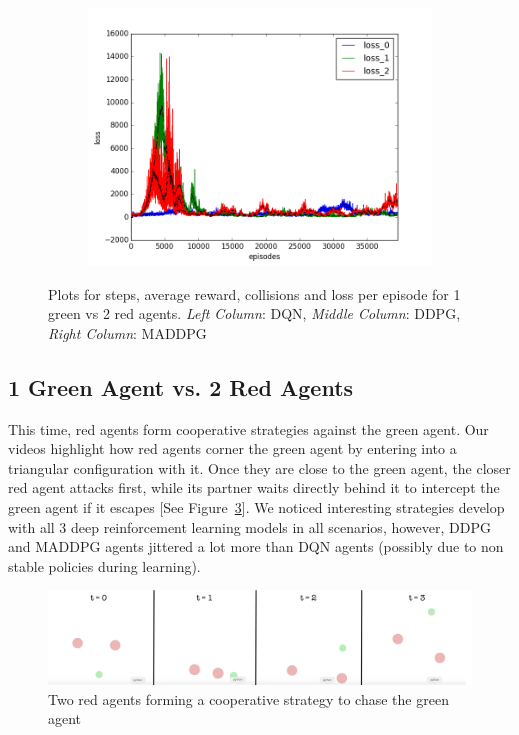 \begin{figure}[t]
\begin{subfigure}[t]{\figscale\linewidth}
    \includegraphics[width=1.5\textwidth]
    {../results/maddpg_2vs1/loss.png}
    \label{fig:maddpg-2vs1-loss}
  \end{subfigure}

  \caption{Plots for steps, average reward, collisions and loss per episode for 1 green vs 2 red agents. \textit{Left Column}: DQN, \textit{Middle Column}: DDPG, \textit{Right Column}: MADDPG}
  \label{fig:2vs1}
\end{figure}
\FloatBarrier

\subsection{1 Green Agent vs. 2 Red Agents}
\label{sec:experiment:2vs1}

This time, red agents form cooperative strategies against the green agent. Our videos highlight how red agents corner the green agent by entering into a triangular configuration with it. Once they are close to the green agent, the closer red agent attacks first, while its partner waits directly behind it to intercept the green agent if it escapes [See Figure~\ref{Figure 5}]. We noticed interesting strategies develop with all 3 deep reinforcement learning models in all scenarios, however, DDPG and MADDPG agents jittered a lot more than DQN agents (possibly due to non stable policies during learning). 

\begin{figure}[h]
    \centering
    \includegraphics[width=\textwidth]{redstrategy}
	\caption{Two red agents forming a cooperative strategy to chase the green agent}\label{Figure 5}
\end{figure}
